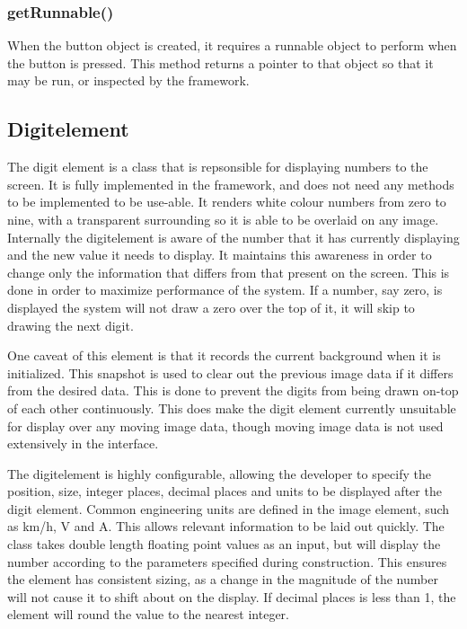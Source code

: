 \subsubsection{getRunnable()}

When the button object is created, it requires a runnable object to perform when the button is pressed. This method returns a pointer to that object so that it may be run, or inspected by the framework.

\subsection{Digitelement}

The digit element is a class that is repsonsible for displaying numbers to the screen. It is fully implemented in the framework, and does not need any methods to be implemented to be use-able. It renders white colour numbers from zero to nine, with a transparent surrounding so it is able to be overlaid on any image. Internally the digitelement is aware of the number that it has currently displaying and the new value it needs to display. It maintains this awareness in order to change only the information that differs from that present on the screen. This is done in order to maximize performance of the system. If a number, say zero, is displayed the system will not draw a zero over the top of it, it will skip to drawing the next digit.

One caveat of this element is that it records the current background when it is initialized. This snapshot is used to clear out the previous image data if it differs from the desired data. This is done to prevent the digits from being drawn on-top of each other continuously. This does make the digit element currently unsuitable for display over any moving image data, though moving image data is not used extensively in the interface.

The digitelement is highly configurable, allowing the developer to specify the position, size, integer places, decimal places and units to be displayed after the digit element. Common engineering units are defined in the image element, such as km/h, V and A. This allows relevant information to be laid out quickly. 
The class takes double length floating point values as an input, but will display the number according to the parameters specified during construction. This ensures the element has consistent sizing, as a change in the magnitude of the number will not cause it to shift about on the display. If decimal places is less than 1, the element will round the value to the nearest integer.

